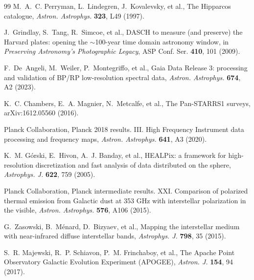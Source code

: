 \documentclass[3p,11pt]{elsarticle}
\begin{document}
\begin{thebibliography}{99}
M.~A.~C. Perryman, L.~Lindegren, J.~Kovalevsky, et al., The Hipparcos catalogue,
\emph{Astron. Astrophys.} \textbf{323}, L49 (1997).

J.~Grindlay, S.~Tang, R.~Simcoe, et al., DASCH to measure (and preserve) the Harvard
plates: opening the $\sim$100-year time domain astronomy window, in \emph{Preserving
Astronomy's Photographic Legacy}, ASP Conf. Ser. \textbf{410}, 101 (2009).

F.~De~Angeli, M.~Weiler, P.~Montegriffo, et al., Gaia Data Release 3: processing and
validation of BP/RP low-resolution spectral data, \emph{Astron. Astrophys.}
\textbf{674}, A2 (2023).

K.~C. Chambers, E.~A. Magnier, N.~Metcalfe, et al., The Pan-STARRS1 surveys,
arXiv:1612.05560 (2016).

Planck Collaboration, Planck 2018 results. III. High Frequency Instrument data
processing and frequency maps, \emph{Astron. Astrophys.} \textbf{641}, A3 (2020).

K.~M. G\'orski, E.~Hivon, A.~J. Banday, et al., HEALPix: a framework for
high-resolution discretization and fast analysis of data distributed on the sphere,
\emph{Astrophys. J.} \textbf{622}, 759 (2005).

Planck Collaboration, Planck intermediate results. XXI. Comparison of polarized thermal
emission from Galactic dust at 353 GHz with interstellar polarization in the visible,
\emph{Astron. Astrophys.} \textbf{576}, A106 (2015).

G.~Zasowski, B.~M\'enard, D.~Bizyaev, et al., Mapping the interstellar medium with
near-infrared diffuse interstellar bands, \emph{Astrophys. J.} \textbf{798}, 35 (2015).

S.~R. Majewski, R.~P. Schiavon, P.~M. Frinchaboy, et al., The Apache Point Observatory
Galactic Evolution Experiment (APOGEE), \emph{Astron. J.} \textbf{154}, 94 (2017).

\end{thebibliography}
\end{document}
